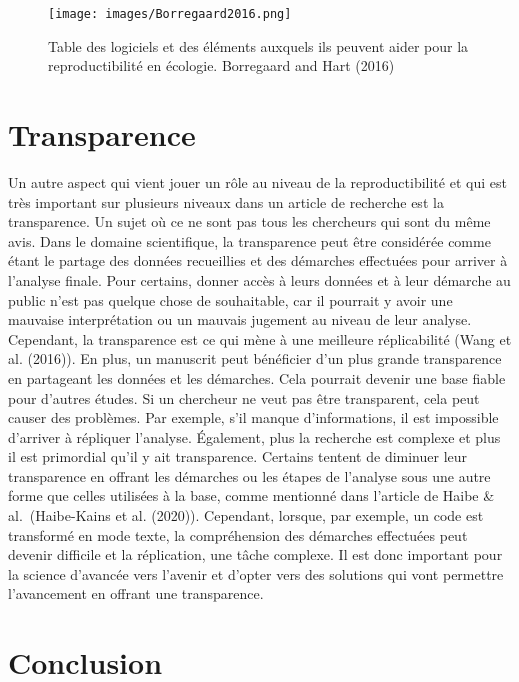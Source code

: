 \documentclass[
]{article}
\begin{document}
\begin{figure}
\centering
\texttt{[image: images/Borregaard2016.png]}
\caption{Table des logiciels et des éléments auxquels ils peuvent aider
pour la reproductibilité en écologie. Borregaard and Hart (2016)}
\end{figure}

\hypertarget{transparence}{%
\section{Transparence}\label{transparence}}

Un autre aspect qui vient jouer un rôle au niveau de la reproductibilité
et qui est très important sur plusieurs niveaux dans un article de
recherche est la transparence. Un sujet où ce ne sont pas tous les
chercheurs qui sont du même avis. Dans le domaine scientifique, la
transparence peut être considérée comme étant le partage des données
recueillies et des démarches effectuées pour arriver à l'analyse finale.
Pour certains, donner accès à leurs données et à leur démarche au public
n'est pas quelque chose de souhaitable, car il pourrait y avoir une
mauvaise interprétation ou un mauvais jugement au niveau de leur
analyse. Cependant, la transparence est ce qui mène à une meilleure
réplicabilité (Wang et al. (2016)). En plus, un manuscrit peut
bénéficier d'un plus grande transparence en partageant les données et
les démarches. Cela pourrait devenir une base fiable pour d'autres
études. Si un chercheur ne veut pas être transparent, cela peut causer
des problèmes. Par exemple, s'il manque d'informations, il est
impossible d'arriver à répliquer l'analyse. Également, plus la recherche
est complexe et plus il est primordial qu'il y ait transparence.
Certains tentent de diminuer leur transparence en offrant les démarches
ou les étapes de l'analyse sous une autre forme que celles utilisées à
la base, comme mentionné dans l'article de Haibe \& al.~(Haibe-Kains et
al. (2020)). Cependant, lorsque, par exemple, un code est transformé en
mode texte, la compréhension des démarches effectuées peut devenir
difficile et la réplication, une tâche complexe. Il est donc important
pour la science d'avancée vers l'avenir et d'opter vers des solutions
qui vont permettre l'avancement en offrant une transparence.

\hypertarget{conclusion}{%
\section{Conclusion}\label{conclusion}}
\end{document}
